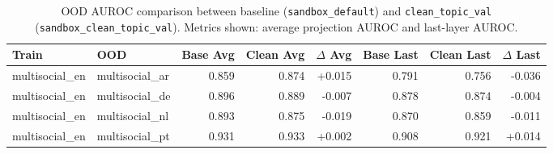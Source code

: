 \begin{table}[t]
\centering
\small
\begin{tabular}{llrrrrrr}
\hline
Train & OOD & Base Avg & Clean Avg & $\Delta$ Avg & Base Last & Clean Last & $\Delta$ Last \\
\hline
multisocial\_en & multisocial\_ar & 0.859 & 0.874 & +0.015 & 0.791 & 0.756 & -0.036 \\
multisocial\_en & multisocial\_de & 0.896 & 0.889 & -0.007 & 0.878 & 0.874 & -0.004 \\
multisocial\_en & multisocial\_nl & 0.893 & 0.875 & -0.019 & 0.870 & 0.859 & -0.011 \\
multisocial\_en & multisocial\_pt & 0.931 & 0.933 & +0.002 & 0.908 & 0.921 & +0.014 \\
\hline
\end{tabular}
\caption{OOD AUROC comparison between baseline (\texttt{sandbox\_default}) and \texttt{clean\_topic\_val} (\texttt{sandbox\_clean\_topic\_val}). Metrics shown: average projection AUROC and last-layer AUROC.}
\label{tab:ood_baseline_vs_clean_topic_val}
\end{table}
